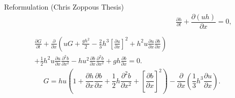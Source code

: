 \documentclass[pdf]{beamer}
\begin{document}
\begin{frame}{Reformulation (Chris Zoppous Thesis)}
	\begin{align*}
	& \frac{\partial h}{\partial t} + \dfrac{\partial (uh)}{\partial x} = 0 ,  \\ \nonumber \\
	\begin{split}
	\frac{\partial G}{\partial t}  + \frac{\partial}{\partial x} \left( {u} G + \frac{gh^2}{2} - \frac{2}{3}h^3 \left[\frac{\partial {u}}{\partial x}\right]^2 + h^2 {u}\frac{\partial {u}}{\partial x}\frac{\partial b}{\partial x} \right) \\ + \frac{1}{2}h^2 {u} \frac{\partial {u}}{\partial x} \frac{\partial^2 b}{\partial x^2}  - h {u}^2\frac{\partial b}{\partial x}\frac{\partial^2 b}{\partial x^2} + gh\frac{\partial b}{\partial x} = 0.
	\end{split}
	\end{align*}
	\[ G =  h {u} \left(1 + \frac{\partial h}{\partial x}\frac{\partial b}{\partial x} + \frac{1}{2}h\frac{\partial^2 b}{\partial x^2} + \left[\frac{\partial b}{\partial x}\right]^2 \right) - \frac{\partial}{\partial x}\left(\frac{1}{3}h^3  \frac{\partial {u}}{\partial x}\right).\]
\end{frame}
\end{document}
